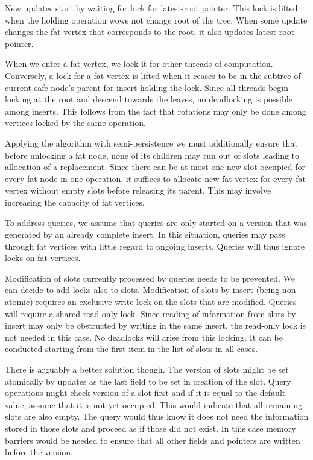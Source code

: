 New updates start by waiting for lock for latest-root pointer. This lock is lifted when the holding operation wows not change root of the tree. When some update changes the fat vertex that corresponds to the root, it also updates latest-root pointer.

When we enter a fat vertex, we lock it for other threads of computation. Conversely, a lock for a fat vertex is lifted when it ceases to be in the subtree of current safe-node's parent for insert holding the lock. Since all threads begin locking at the root and descend towards the leaves, no deadlocking is possible among inserts. This follows from the fact that rotations may only be done among vertices locked by the same operation.

Applying the algorithm with semi-persistence we must additionally ensure that before unlocking a fat node, none of its children may run out of slots leading to allocation of a replacement. Since there can be at most one new slot occupied for every fat node in one operation, it suffices to allocate new fat vertex for every fat vertex without empty slots before releasing its parent. This may involve increasing the capacity of fat vertices.

To address queries, we assume that queries are only started on a version that was generated by an already complete insert. In this situation, queries may pass through fat vertices with little regard to ongoing inserts. Queries will thus ignore locks on fat vertices. 

Modification of slots currently processed by queries needs to be prevented. We can decide to add locks also to slots. Modification of slots by insert (being non-atomic) requires an exclusive write lock on the slots that are modified. Queries will require a shared read-only lock. Since reading of information from slots by insert may only be obstructed by writing in the same insert, the read-only lock is not needed in this case. No deadlocks will arise from this locking. It can be conducted starting from the first item in the list of slots in all cases. 

There is arguably a better solution though. The version of slots might be set atomically by updates as the last field to be set in creation of the slot. Query operations might check version of a slot first and if it is equal to the default value, assume that it is not yet occupied. This would indicate that all remaining slots are also empty. The query would thus know it does not need the information stored in those slots and proceed as if those did not exist. 
In this case memory barriers would be needed to ensure that all other fields and pointers are written before the version.

